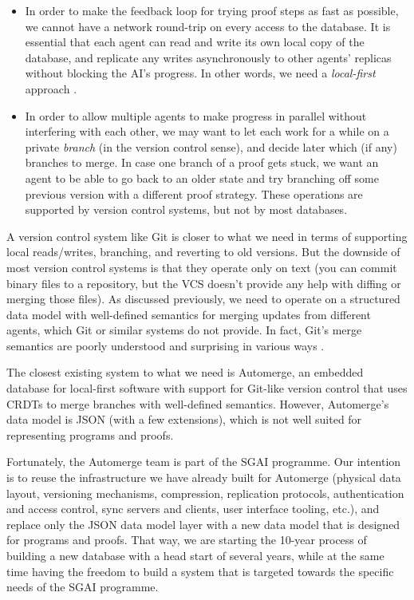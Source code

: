 \documentclass{article}
\begin{document}
\begin{itemize}
    \item In order to make the feedback loop for trying proof steps as fast as possible, we cannot have a network round-trip on every access to the database.
        It is essential that each agent can read and write its own local copy of the database, and replicate any writes asynchronously to other agents' replicas without blocking the AI's progress.
        In other words, we need a \emph{local-first} approach \citep{kleppmann-2019-localfirst}.

    \item In order to allow multiple agents to make progress in parallel without interfering with each other, we may want to let each work for a while on a private \emph{branch} (in the version control sense), and decide later which (if any) branches to merge.
        In case one branch of a proof gets stuck, we want an agent to be able to go back to an older state and try branching off some previous version with a different proof strategy.
        These operations are supported by version control systems, but not by most databases.
\end{itemize}

A version control system like Git is closer to what we need in terms of supporting local reads/writes, branching, and reverting to old versions.
But the downside of most version control systems is that they operate only on text (you can commit binary files to a repository, but the VCS doesn't provide any help with diffing or merging those files).
As discussed previously, we need to operate on a structured data model with well-defined semantics for merging updates from different agents, which Git or similar systems do not provide.
In fact, Git's merge semantics are poorly understood and surprising in various ways \citep{glodny-2025}.

The closest existing system to what we need is Automerge, an embedded database for local-first software with support for Git-like version control that uses CRDTs \citep{shapiro-2025-crdt} to merge branches with well-defined semantics.
However, Automerge's data model is JSON (with a few extensions), which is not well suited for representing programs and proofs.

Fortunately, the Automerge team is part of the SGAI programme.
Our intention is to reuse the infrastructure we have already built for Automerge (physical data layout, versioning mechanisms, compression, replication protocols, authentication and access control, sync servers and clients, user interface tooling, etc.), and replace only the JSON data model layer with a new data model that is designed for programs and proofs.
That way, we are starting the 10-year process of building a new database with a head start of several years, while at the same time having the freedom to build a system that is targeted towards the specific needs of the SGAI programme.
\end{document}

